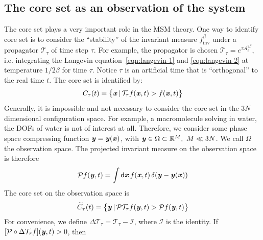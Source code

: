 \documentclass[aip,jcp,a4paper,reprint,onecolumn]{revtex4-1}
\newcommand{\vect}[1]{\textbf{\textit{#1}}}
\newcommand{\dd}{\textsf{d}}
\newcommand{\inv}{\textrm{inv}}
\newcommand{\mt}{\mathcal T}
\newcommand{\fwg}{{\mathcal A}}
\begin{document}
\subsection{The core set as an observation of the system}

The core set plays a very important role in the MSM theory. One way to
identify core set is to consider the ``stability'' of the invariant
measure $f^\beta_{\inv}$ under a propagator $\mt_\tau$
of time step $\tau$.
For example, the propagator is chosen $\mt_\tau = e^{\tau\fwg_t^{2\beta}}$,
i.e. integrating the Langevin equation~\eqref{eqn:langevin-1}
and \eqref{eqn:langevin-2} at temperature $1/2\beta$ for time $\tau$.
Notice $\tau$ is an artificial time that is ``orthogonal'' to the real
time $t$.
The core set is identified by:
\begin{align}
  C_\tau(t) = \big\{
  \vect x \,\vert\, \mt_\tau f(\vect x, t) > f(\vect x, t)
  \big\}
\end{align}
Generally, it is impossible and not necessary to consider the core set
in the $3N$ dimensional configuration space. For example, a
macromolecule solving in water, the DOFs of water is not of interest
at all. Therefore, we consider some phase space compressing function
$\vect y = \vect y(\vect x)$, with $\vect y \in \Omega \subset \mathbb
R^M,\ M\ll 3N$. We call $\Omega$ the observation space.  The projected
invariant measure on the observation space is therefore
\begin{align}
  \mathcal P f (\vect y, t)
  =
  \int
  \dd \vect x\,
  f(\vect x, t) \,
  \delta (\vect y - \vect y(\vect x)) 
\end{align}
The core set on the observation space is
\begin{align}
  \widetilde
  C_\tau(t) = \big\{
  \vect y \,\vert\,
  \mathcal P\mt_\tau f(\vect y, t) > \mathcal P f(\vect y, t)
  \big\}
\end{align}
For convenience, we define $\Delta \mt_\tau =
\mt_\tau - \mathcal I$, where $\mathcal I$ is the
identity. If $[\mathcal P\circ\Delta \mt_\tau f](\vect y, t) > 0$, then
\end{document}
